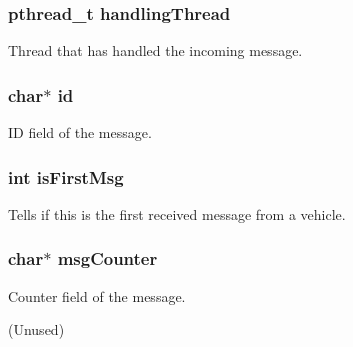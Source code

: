 \subsubsection[{\texorpdfstring{handling\+Thread}{handlingThread}}]{\setlength{\rightskip}{0pt plus 5cm}pthread\+\_\+t handling\+Thread}\hypertarget{struct_m_e_s_s_a_g_e_a868bf6ba4aea009042e5d6ec5639d433}{}\label{struct_m_e_s_s_a_g_e_a868bf6ba4aea009042e5d6ec5639d433}


Thread that has handled the incoming message. 

\subsubsection[{\texorpdfstring{id}{id}}]{\setlength{\rightskip}{0pt plus 5cm}char$\ast$ id}\hypertarget{struct_m_e_s_s_a_g_e_aecb3b0d045ada529257a2fbf8f829599}{}\label{struct_m_e_s_s_a_g_e_aecb3b0d045ada529257a2fbf8f829599}


ID field of the message. 

\subsubsection[{\texorpdfstring{is\+First\+Msg}{isFirstMsg}}]{\setlength{\rightskip}{0pt plus 5cm}int is\+First\+Msg}\hypertarget{struct_m_e_s_s_a_g_e_aff6139ee4d5782154b1c0732115ceb3f}{}\label{struct_m_e_s_s_a_g_e_aff6139ee4d5782154b1c0732115ceb3f}


Tells if this is the first received message from a vehicle. 

\subsubsection[{\texorpdfstring{msg\+Counter}{msgCounter}}]{\setlength{\rightskip}{0pt plus 5cm}char$\ast$ msg\+Counter}\hypertarget{struct_m_e_s_s_a_g_e_ab1cb0f33b24d0064d9bb8799dcec7444}{}\label{struct_m_e_s_s_a_g_e_ab1cb0f33b24d0064d9bb8799dcec7444}


Counter field of the message. 

(Unused) 
